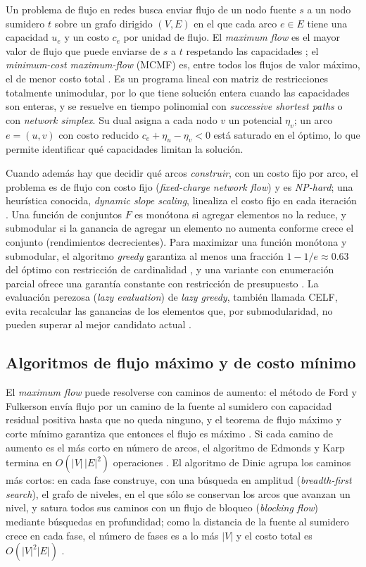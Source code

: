 Un problema de flujo en redes busca enviar flujo de un nodo fuente $s$ a un nodo sumidero $t$ sobre un grafo dirigido $(V,E)$ en el que cada arco $e\in E$ tiene una capacidad $u_e$ y un costo $c_e$ por unidad de flujo. El \emph{maximum flow} es el mayor valor de flujo que puede enviarse de $s$ a $t$ respetando las capacidades ; el \emph{minimum-cost maximum-flow} (MCMF) es, entre todos los flujos de valor máximo, el de menor costo total . Es un programa lineal con matriz de restricciones totalmente unimodular, por lo que tiene solución entera cuando las capacidades son enteras, y se resuelve en tiempo polinomial con \emph{successive shortest paths} o con \emph{network simplex}. Su dual asigna a cada nodo $v$ un potencial $\eta_v$; un arco $e=(u,v)$ con costo reducido $c_e+\eta_u-\eta_v<0$ está saturado en el óptimo, lo que permite identificar qué capacidades limitan la solución.

Cuando además hay que decidir qué arcos \emph{construir}, con un costo fijo por arco, el problema es de flujo con costo fijo (\emph{fixed-charge network flow}) y es \emph{NP-hard}; una heurística conocida, \emph{dynamic slope scaling}, linealiza el costo fijo en cada iteración . Una función de conjuntos $F$ es monótona si agregar elementos no la reduce, y submodular si la ganancia de agregar un elemento no aumenta conforme crece el conjunto (rendimientos decrecientes). Para maximizar una función monótona y submodular, el algoritmo \emph{greedy} garantiza al menos una fracción $1-1/e\approx0.63$ del óptimo con restricción de cardinalidad , y una variante con enumeración parcial ofrece una garantía constante con restricción de presupuesto . La evaluación perezosa (\emph{lazy evaluation}) de \emph{lazy greedy}, también llamada CELF, evita recalcular las ganancias de los elementos que, por submodularidad, no pueden superar al mejor candidato actual .

\subsection{Algoritmos de flujo máximo y de costo mínimo}\label{sec:teoria_alg}

El \emph{maximum flow} puede resolverse con caminos de aumento: el método de Ford y Fulkerson envía flujo por un camino de la fuente al sumidero con capacidad residual positiva hasta que no queda ninguno, y el teorema de flujo máximo y corte mínimo garantiza que entonces el flujo es máximo . Si cada camino de aumento es el más corto en número de arcos, el algoritmo de Edmonds y Karp termina en $O(|V|\,|E|^2)$ operaciones . El algoritmo de Dinic agrupa los caminos más cortos: en cada fase construye, con una búsqueda en amplitud (\emph{breadth-first search}), el grafo de niveles, en el que sólo se conservan los arcos que avanzan un nivel, y satura todos sus caminos con un flujo de bloqueo (\emph{blocking flow}) mediante búsquedas en profundidad; como la distancia de la fuente al sumidero crece en cada fase, el número de fases es a lo más $|V|$ y el costo total es $O(|V|^2|E|)$ .

